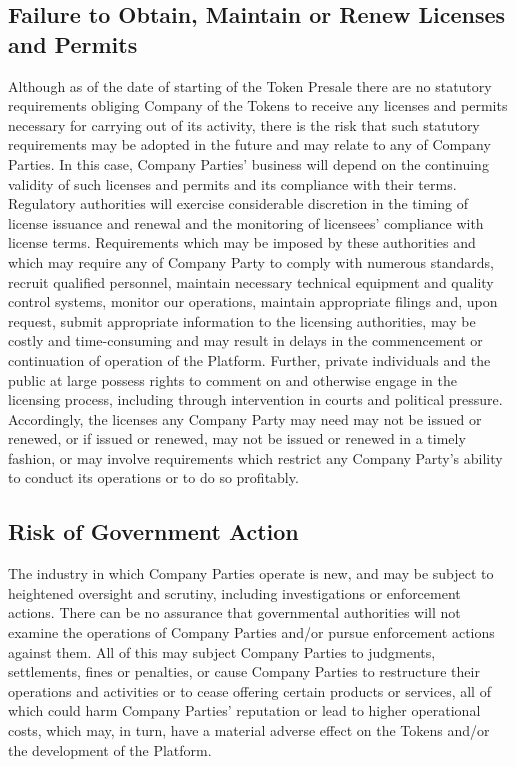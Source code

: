 \documentclass[12pt]{report}
\begin{document}
\subsection{Failure to Obtain, Maintain or Renew Licenses and Permits}
Although as of the date of starting of the Token Presale there are no statutory requirements obliging Company of the Tokens to receive any licenses and permits necessary for carrying out of its activity, there is the risk that such statutory requirements may be adopted in the future and may relate to any of Company Parties. In this case, Company Parties’ business will depend on the continuing validity of such licenses and permits and its compliance with their terms. Regulatory authorities will exercise considerable discretion in the timing of license issuance and
renewal and the monitoring of licensees’ compliance with license terms. Requirements which may be imposed by these authorities and which may require any of Company Party to comply with numerous standards, recruit qualified personnel, maintain necessary technical equipment and quality control systems, monitor our operations, maintain appropriate filings and, upon request, submit appropriate information to the licensing authorities, may be costly and time-consuming and may result in delays in the commencement or continuation of operation of the
Platform. Further, private individuals and the public at large possess rights to comment on and otherwise engage in the licensing process, including through intervention in courts and political pressure. Accordingly, the licenses any
Company Party may need may not be issued or renewed, or if issued or renewed, may not be issued or renewed in a timely fashion, or may involve requirements which restrict any Company Party’s ability to conduct its operations or to do so profitably.

\subsection{Risk of Government Action}
The industry in which Company Parties operate is new, and may be subject to heightened oversight and scrutiny, including investigations or enforcement actions. There can be no assurance that governmental authorities will not examine the operations of Company Parties and/or pursue enforcement actions against them. All of this may subject Company Parties to judgments, settlements, fines or penalties, or cause Company Parties to restructure their operations and activities or to cease offering certain products or services, all of which could harm Company Parties’ reputation or lead to higher operational costs, which may, in turn, have a material adverse effect on the Tokens and/or the development of the Platform.
\end{document}
